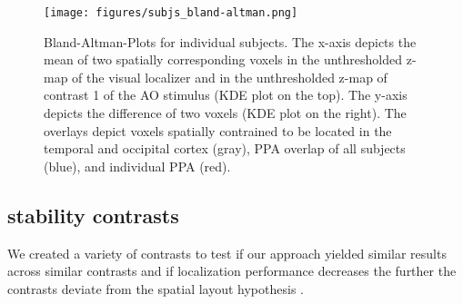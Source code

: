 \documentclass[english]{article}
\begin{document}
\begin{figure} \centering
    \texttt{[image: figures/subjs\_bland-altman.png]}
    \caption{Bland-Altman-Plots for individual subjects. The x-axis depicts the
        mean of two spatially corresponding voxels in the unthresholded z-map of
        the visual localizer and in the unthresholded z-map of contrast 1 of the
        AO stimulus (KDE plot on the top). The y-axis depicts the difference of
        two voxels (KDE plot on the right). The overlays depict voxels spatially
        contrained to be located in the temporal and occipital cortex (gray),
    PPA overlap of all subjects (blue), and individual PPA (red).}
    \label{fig:bland-altman} \end{figure}


\subsection{stability contrasts}




We created a variety of contrasts to test if our approach yielded
similar results across similar contrasts and if localization performance
decreases the further the contrasts deviate from the spatial layout hypothesis
.
\end{document}
